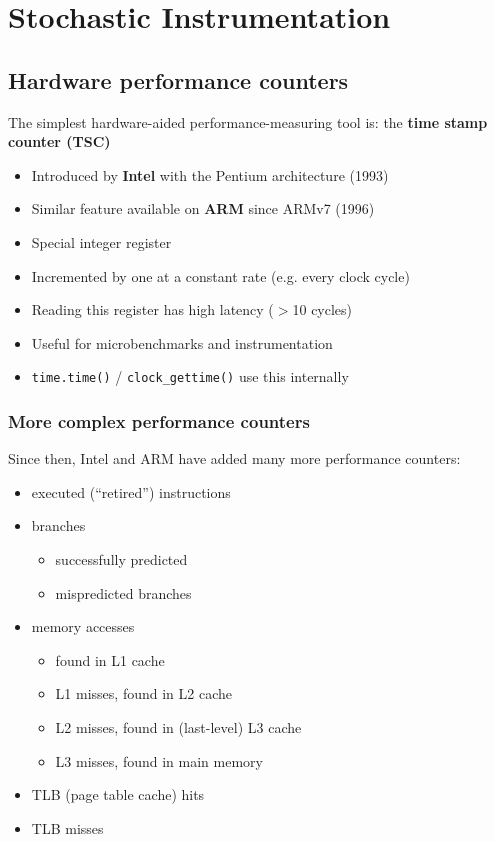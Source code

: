 \documentclass[12pt]{article}
\begin{document}
\newpage
\section{Stochastic Instrumentation}

\subsection{Hardware performance counters}

The simplest hardware-aided performance-measuring tool is:
the \textbf{time stamp counter (TSC)}
\begin{itemize}
    \item Introduced by \textbf{Intel} with the Pentium architecture (1993)
    \item Similar feature available on \textbf{ARM} since ARMv7 (1996)
    \item Special integer register
    \item Incremented by one at a constant rate (e.g. every clock cycle)
    \item Reading this register has high latency ($>$10 cycles)
    \item Useful for microbenchmarks and instrumentation
    \item \texttt{time.time()} / \texttt{clock\_gettime()} use this internally
\end{itemize}
\subsubsection{More complex performance counters}

Since then, Intel and ARM have added many more performance counters:

\begin{itemize}
  \item executed (“retired”) instructions
  \item branches
  \begin{itemize}
    \item successfully predicted
    \item mispredicted branches
  \end{itemize}
  \item memory accesses
  \begin{itemize}
    \item found in L1 cache
    \item L1 misses, found in L2 cache
    \item L2 misses, found in (last-level) L3 cache
    \item L3 misses, found in main memory
  \end{itemize}
  \item TLB (page table cache) hits
  \item TLB misses
\end{itemize}
\end{document}
